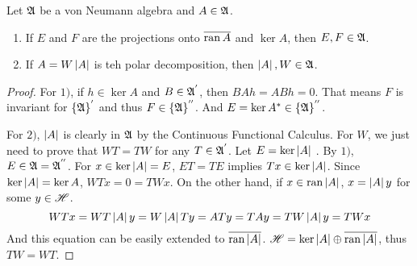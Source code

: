 \documentclass[a4paper,11pt]{report}
\begin{document}
\begin{prop}
	Let $\mathfrak{A}$ be a von Neumann algebra and $A \in \mathfrak{A}$.
	\begin{enumerate}[label=\arabic*)]
		\item If $E$ and $F$ are the projections onto $\overline{\operatorname{ran}{A}}$ and $\ker{A}$, then $E,F \in \mathfrak{A}$.
		\item If $A = W\left\lvert A\right\lvert$ is teh polar decomposition, then $\left\lvert A\right\lvert,W \in \mathfrak{A}$.
	\end{enumerate}
\end{prop}
\begin{proof}
	For $1)$, if $h \in \ker{A}$ and $B \in \mathfrak{A}^{'}$, then $BAh = ABh = 0$. That means $F$ is invariant for $\{\mathfrak{A}\}^{'}$ and thus $F \in \{\mathfrak{A}\}^{''}$. And $E = \ker{A^{*}} \in \{\mathfrak{A}\}^{''}$.
	\item For $2)$, $\left\lvert A\right\lvert$ is clearly in $\mathfrak{A}$ by the Continuous Functional Calculus. For $W$, we just need to prove that $WT=TW$ for any $T \in \mathfrak{A}^{'}$. Let $E = \ker{\left\lvert A\right\lvert}$ . By $1)$, $E \in \mathfrak{A} = \mathfrak{A}^{''}$. For $x \in \ker{\left\lvert A\right\lvert} = E$, $ET=TE$ implies $Tx \in \ker{\left\lvert A\right\lvert}$. Since $\ker{\left\lvert A\right\lvert} = \ker{A}$, $WTx =0 = TWx$. On the other hand, if $x \in \operatorname{ran}{\left\lvert A\right\lvert}$, $x = \left\lvert A\right\lvert y$ for some $y \in \mathscr{H}$.
	\begin{equation*}
		WTx = WT\left\lvert A\right\lvert y = W\left\lvert A\right\lvert Ty = ATy= TAy = TW\left\lvert A\right\lvert y = TWx
	\end{equation*} 
	And this equation can be easily extended to $\overline{\operatorname{ran}{\left\lvert A\right\lvert}}$. $\mathscr{H} = \ker{\left\lvert A\right\lvert} \oplus \overline{\operatorname{ran}{\left\lvert A\right\lvert}}$, thus $TW=WT$.
\end{proof}
\end{document}
